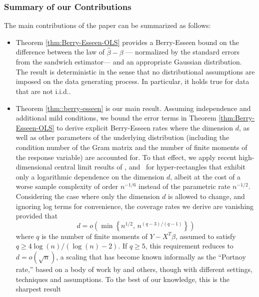 \documentclass{article}
\let\hat\widehat
\begin{document}
 
 
 
 
 
 
 \subsubsection*{Summary of our Contributions}
 The main
 contributions of the paper can be summarized as follows:
 \begin{itemize}
 \item Theorem \ref{thm:Berry-Esseen-OLS} 
 provides a Berry-Esseen bound
 on the difference between
 the law of $\hat\beta - \beta$ ---
 normalized by the standard errors from the sandwich estimator---
 and an appropriate Gaussian distribution.
 The result is deterministic in the sense that
 no distributional assumptions are imposed
 on the data generating process. In particular, it holds true for data that are not i.i.d..
 
 \item
 Theorem \ref{thm::berry-esseen} 
 is our main result.
 Assuming independence and additional mild conditions,
 we bound the error terms in
 Theorem \ref{thm:Berry-Esseen-OLS} 
 to derive explicit Berry-Esseen rates where the dimension $d$, as well as other parameters of the underlying distribution (including the condition number of the Gram matrix and the number of finite moments of the response variable) are accounted for.
 To that effect, we apply recent high-dimensional central limit results of \cite{koike2019high}, and~\cite{Chern17} for hyper-rectangles that exhibit only a logarithmic dependence on the dimension $d$, albeit at the cost of a worse sample complexity of order  $n^{-1/6}$ instead of the parametric rate $n^{-1/2}$.
 Considering  the case where only the dimension $d$ is allowed to change, and ignoring log terms for convenience, the coverage rates we derive are vanishing provided that
 $$
 d = o\left(\min\left\{n^{1/2},\, n^{(q-3)/(q-1)}\right\}\right)
 $$
 where $q$ is the number of
 finite moments of
 $Y-X^T\beta$, assumed to satisfy $q \geq 4 \log(n)/(\log(n) - 2)$. 
 If $q \ge 5$, this requirement reduces to $d = o(\sqrt{n})$, a scaling that has become  known informally as the ``Portnoy rate,'' based on a body of work by  \cite{Portnoy84,Portnoy85,Portnoy86,Portnoy88} and others, though with different settings, techniques  and assumptions. 
 To the best of our knowledge,
 this is the sharpest result
 

\end{itemize}
\end{document}
